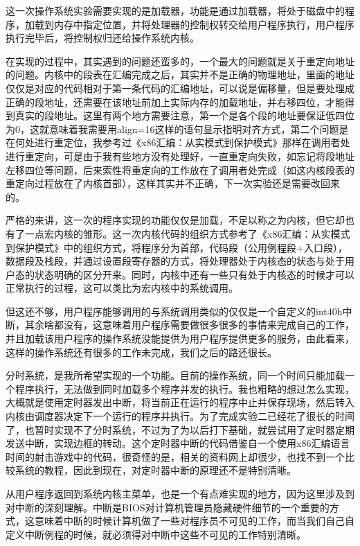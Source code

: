 \documentclass[forprint]{WHUBachelor}
\begin{document}
这一次操作系统实验需要实现的是加载器，功能是通过加载器，将处于磁盘中的程序，加载到内存中指定位置，并将处理器的控制权转交给用户程序执行，用户程序执行完毕后，将控制权归还给操作系统内核。

在实现的过程中，其实遇到的问题还蛮多的，一个最大的问题就是关于重定向地址的问题。内核中的段表在汇编完成之后，其实并不是正确的物理地址，里面的地址仅仅是对应的代码相对于第一条代码的汇编地址，可以说是偏移量，但是要处理成正确的段地址，还需要在该地址前加上实际内存的加载地址，并右移四位，才能得到真实的段地址。这里有两个地方需要注意，第一个是各个段的地址要保证低四位为0，这就意味着我需要用align=16这样的语句显示指明对齐方式，第二个问题是在何处进行重定位，我参考过《x86汇编：从实模式到保护模式》那样在调用者处进行重定向，可是由于我有些地方没有处理好，一直重定向失败，如忘记将段地址左移四位等问题，后来索性将重定向的工作放在了调用者处完成（如这内核段表的重定向过程放在了内核首部），这样其实并不正确，下一次实验还是需要改回来的。

严格的来讲，这一次的程序实现的功能仅仅是加载，不足以称之为内核，但它却也有了一点宏内核的雏形。这一次内核代码的组织方式参考了《x86汇编：从实模式到保护模式》中的组织方式，将程序分为首部，代码段（公用例程段+入口段），数据段及栈段，并通过设置段寄存器的方式，将处理器处于内核态的状态与处于用户态的状态明确的区分开来。同时，内核中还有一些只有处于内核态的时候才可以正常执行的过程，这可以类比为宏内核中的系统调用。

但这还不够，用户程序能够调用的与系统调用类似的仅仅是一个自定义的int40h中断，其余啥都没有，这意味着用户程序需要做很多很多的事情来完成自己的工作，并且加载该用户程序的操作系统没能提供为用户程序提供更多的服务，由此看来，这样的操作系统还有很多的工作未完成，我们之后的路还很长。

分时系统，是我所希望实现的一个功能。目前的操作系统，同一个时间只能加载一个程序执行，无法做到同时加载多个程序并发的执行。我也粗略的想过怎么实现，大概就是使用定时器发出中断，将当前正在运行的程序中止并保存现场，然后转入内核由调度器决定下一个运行的程序并执行。为了完成实验二已经花了很长的时间了，也暂时实现不了分时系统，不过为了为以后打下基础，就尝试用了定时器定期发送中断，实现边框的转动。这个定时器中断的代码借鉴自一个使用x86汇编语言时间的射击游戏中的代码，很奇怪的是，相关的资料网上却很少，也找不到一个比较系统的教程，因此到现在，对定时器中断的原理还不是特别清晰。

从用户程序返回到系统内核主菜单，也是一个有点难实现的地方，因为这里涉及到对中断的深刻理解。中断是BIOS对计算机管理员隐藏硬件细节的一个重要的方式，这意味着中断的时候计算机做了一些对程序员不可见的工作，而当我们自己自定义中断例程的时候，就必须得对中断中这些不可见的工作特别清晰。
\end{document}
